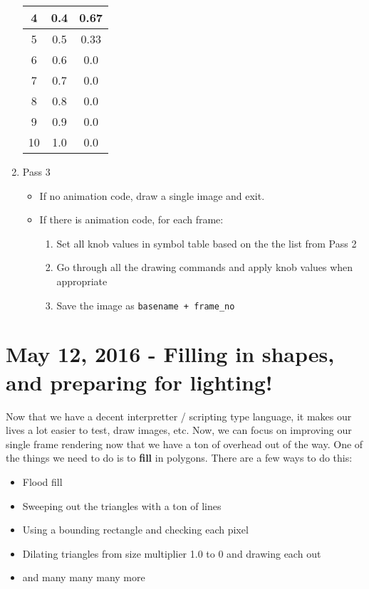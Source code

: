 \documentclass[11pt,fleqn]{article}
\theoremstyle{definition}
\begin{document}
\begin{enumerate}
\begin{table}[!htpb]
\begin{tabular}{|c|c|c|}
                4 & 0.4 & 0.67 \\
                \hline
                5 & 0.5 & 0.33 \\
                \hline
                6 & 0.6 & 0.0 \\
                \hline
                7 & 0.7 & 0.0 \\
                \hline
                8 & 0.8 & 0.0 \\
                \hline
                9 & 0.9 & 0.0 \\
                \hline
                10 & 1.0 & 0.0 \\
                \hline
            \end{tabular}
        \end{table}
    \item Pass 3
        \begin{itemize}
            \item If no animation code, draw a single image and exit.
            \item If there is animation code, for each frame:
                \begin{enumerate}
                    \item Set all knob values in symbol table based on the the list
                        from Pass 2
                    \item Go through all the drawing commands and apply knob values
                        when appropriate
                    \item Save the image as \texttt{basename + frame\_no}
                \end{enumerate}
        \end{itemize}
\end{enumerate}

\section{May 12, 2016 - Filling in shapes, and preparing for lighting!}

Now that we have a decent interpretter / scripting type language, it makes our lives
a lot easier to test, draw images, etc. Now, we can focus on improving our single
frame rendering now that we have a ton of overhead out of the way. One of the things
we need to do is to \textbf{fill} in polygons. There are a few ways to do this:

\begin{itemize}
    \item Flood fill
    \item Sweeping out the triangles with a ton of lines
    \item Using a bounding rectangle and checking each pixel
    \item Dilating triangles from size multiplier 1.0 to 0 and drawing each out
    \item and many many many more
\end{itemize}
\end{document}
